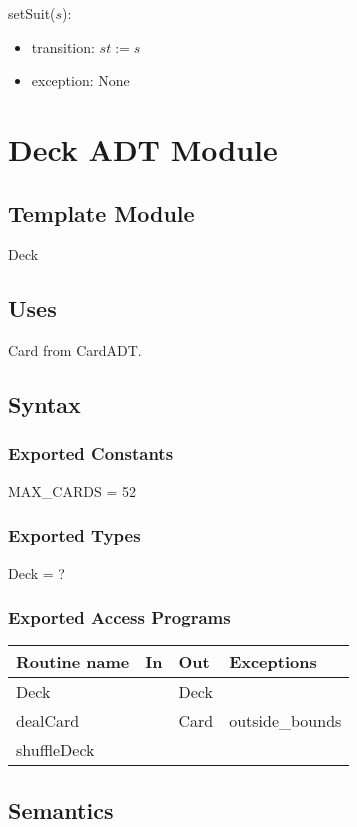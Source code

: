 \documentclass[12pt]{article}
\begin{document}
\noindent setSuit($s$):
\begin{itemize}
\item transition: $st := s$
\item exception: None
\end{itemize}

\newpage

\section* {Deck ADT Module}

\subsection*{Template Module}

Deck 

\subsection* {Uses}
Card from CardADT.
\subsection* {Syntax}

\subsubsection* {Exported Constants}
MAX\_CARDS = 52

\subsubsection* {Exported Types}
Deck = ?

\subsubsection* {Exported Access Programs}

\begin{tabular}{| l | l | l | l |}
\hline
\textbf{Routine name} & \textbf{In} & \textbf{Out} & \textbf{Exceptions}\\
\hline
Deck &  & Deck & \\
\hline
dealCard & ~ &Card & outside\_bounds \\
\hline
shuffleDeck & ~ &  & \\
\hline

\end{tabular}

\subsection* {Semantics}
\end{document}
